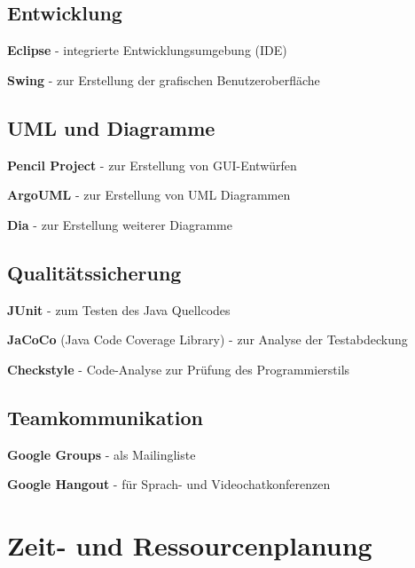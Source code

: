 \documentclass[10pt,a4paper]{article}
\begin{document}
\subsection{Entwicklung}
	\begin{list}{\quad}{}
		\item \textbf{Eclipse} - integrierte Entwicklungsumgebung (IDE)
		\item \textbf{Swing} - zur Erstellung der grafischen Benutzeroberfläche
	\end{list}
	
\subsection{UML und Diagramme}
	\begin{list}{\quad}{}
		\item \textbf{Pencil Project} - zur Erstellung von GUI-Entwürfen
		\item \textbf{ArgoUML} - zur Erstellung von UML Diagrammen
		\item \textbf{Dia} - zur Erstellung weiterer Diagramme
	\end{list}

\subsection{Qualitätssicherung}
	\begin{list}{\quad}{}
		\item \textbf{JUnit} - zum Testen des Java Quellcodes
		\item \textbf{JaCoCo} (Java Code Coverage Library) - zur Analyse der Testabdeckung
		\item \textbf{Checkstyle} - Code-Analyse zur Prüfung des Programmierstils
	\end{list}

\subsection{Teamkommunikation}
	\begin{list}{\quad}{}
		\item \textbf{Google Groups} - als Mailingliste
		\item \textbf{Google Hangout} - für Sprach- und Videochatkonferenzen
	\end{list}

\section{Zeit- und Ressourcenplanung}
\end{document}
